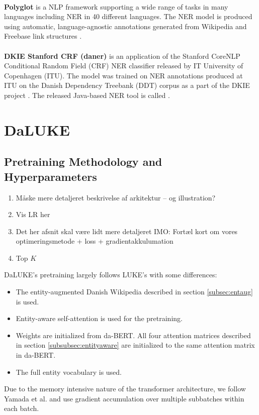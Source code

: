 \documentclass[main.tex]{subfiles}
\begin{document}
\\
\textbf{Polyglot}
is a NLP framework supporting a wide range of tasks in many languages including NER in 40 different languages.
The NER model is produced using automatic, language-agnostic annotations generated from Wikipedia and Freebase link structures \cite{rfou2015polyglot}.\\
\\
\textbf{DKIE Stanford CRF (daner)}
is an application of the Stanford CoreNLP Conditional Random Field (CRF) NER classifier \cite{manning2014corenlp} released by IT University of Copenhagen (ITU).
The model was trained on NER annotations produced at ITU on the Danish Dependency Treebank (DDT) corpus \cite{kromann2003ddt} as a part of the DKIE project \cite{derc2014dkie}.
The released Java-based NER tool is called \footnotemark.

\section{DaLUKE}

\subsection{Pretraining Methodology and Hyperparameters}%
\label{sub:dalpre}
\begin{enumerate}
    \item Måske mere detaljeret beskrivelse af arkitektur -- og illustration?
    \item Vis LR her
    \item Det her afsnit skal være lidt mere detaljeret IMO: Fortæl kort om vores optimeringsmetode + loss + gradientakkulumation
    \item Top $K$
\end{enumerate}
DaLUKE's pretraining largely follows LUKE's with some differences:
\begin{itemize}
    \item The entity-augmented Danish Wikipedia described in section \ref{subsec:entaug} is used.
    \item Entity-aware self-attention is used for the pretraining.
    \item Weights are initialized from da-BERT.
    All four attention matrices described in section \ref{subsubsec:entityaware} are initialized to the same attention matrix in da-BERT.
    \item The full entity vocabulary is used.
\end{itemize}
Due to the memory intensive nature of the transformer architecture, we follow Yamada et al. and use gradient accumulation over multiple subbatches within each batch.
\end{document}
